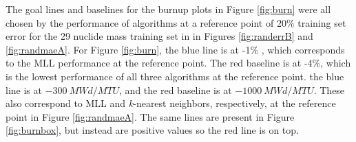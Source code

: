 The goal lines and baselines for the burnup plots in Figure \ref{fig:burn} were
all chosen by the performance of algorithms at a reference point of 20\%
training set error for the 29 nuclide mass training set in in Figures
\ref{fig:randerrB} and \ref{fig:randmaeA}.  For Figure \ref{fig:burn}, the
blue line is at -1\% , which corresponds to the \gls{MLL} performance at the
reference point.  The red baseline is at -4\%, which is the lowest performance
of all three algorithms at the reference point.  
the blue line is at $-300\:MWd/MTU$, and the red baseline is at
$-1000\:MWd/MTU$.  These also correspond to \gls{MLL} and \textit{k}-nearest
neighbors, respectively, at the reference point in Figure \ref{fig:randmaeA}.
The same lines are present in Figure \ref{fig:burnbox}, but instead are
positive values so the red line is on top.  

